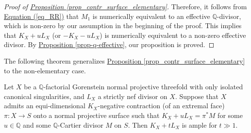 \begin{proof}[Proof of {\hyperref[prop_contr_surface_elementary]{Proposition   \ref*{prop_contr_surface_elementary}}}]
Therefore, it follows from {\hyperref[eq_RR]{Equation  (\ref*{eq_RR})}}  that $M_1$ is numerically equivalent to an effective $\mathbb{Q}$-divisor, which is non-zero by our assumption in the beginning of the proof.
This implies that 
 $K_X+uL_X$ (or $-K_X-uL_X$) is  numerically equivalent to  a non-zero effective divisor. 
By {\hyperref[prop-q-effective]{Proposition  \ref*{prop-q-effective}}}, our proposition is proved.
\end{proof}


The following theorem generalizes {\hyperref[prop_contr_surface_elementary]{Proposition   \ref*{prop_contr_surface_elementary}}} to the non-elementary case.


\begin{thm}\label{thm_contr_surface_conic}
Let $X$ be a $\mathbb{Q}$-factorial Gorenstein normal projective threefold with only isolated  canonical singularities,  and $L_X$ a strictly nef divisor on $X$.
Suppose that $X$ admits an equi-dimensional  $K_X$-negative contraction (of an extremal face) $\pi:X\to S$ onto a normal projective surface such that $K_X+uL_X=\pi^*M$ for some $u\in\mathbb{Q}$ and some $\mathbb{Q}$-Cartier divisor $M$ on $S$.
Then $K_X+tL_X$ is ample for $t\gg 1$.
\end{thm}




